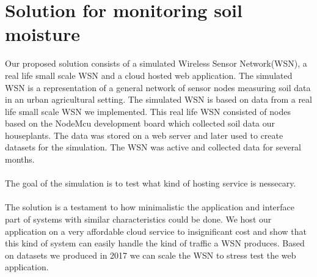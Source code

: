 \documentclass[]{uiophd}
\begin{document}
\chapter{Solution for monitoring soil moisture}
Our proposed solution consists of a simulated Wireless Sensor Network(WSN), a real life small scale WSN and a cloud hosted web application. The simulated WSN is a representation of a general network of sensor nodes measuring soil data in an urban agricultural setting. The simulated WSN is based on data from a real life small scale WSN we implemented. This real life WSN consisted of nodes based on the NodeMcu development board which collected soil data our houseplants. The data was stored on a web server and later used to create datasets for the simulation. The WSN was active and collected data for several months. 
\\\\
The goal of the simulation is to test what kind of hosting service is nessecary.
\\\\
The solution is a testament to how minimalistic the application and interface part of systems with similar characteristics could be done. We host our application on a very affordable cloud service to insignificant cost and show that this kind of system can easily handle the kind of traffic a WSN produces. Based on datasets we produced in 2017 we can scale the WSN to stress test the web application.
\end{document}
